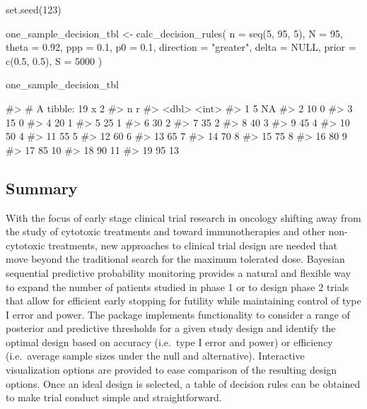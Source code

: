 \begin{Schunk}
\begin{Sinput}
set.seed(123)

one_sample_decision_tbl <- 
  calc_decision_rules(
    n = seq(5, 95, 5),
    N = 95, 
    theta = 0.92, 
    ppp = 0.1, 
    p0 = 0.1, 
    direction = "greater",
    delta = NULL, 
    prior = c(0.5, 0.5), 
    S = 5000
    )
\end{Sinput}
\end{Schunk}

\begin{Schunk}
\begin{Sinput}
one_sample_decision_tbl
\end{Sinput}
\begin{Soutput}
#> # A tibble: 19 x 2
#>        n     r
#>    <dbl> <int>
#>  1     5    NA
#>  2    10     0
#>  3    15     0
#>  4    20     1
#>  5    25     1
#>  6    30     2
#>  7    35     2
#>  8    40     3
#>  9    45     4
#> 10    50     4
#> 11    55     5
#> 12    60     6
#> 13    65     7
#> 14    70     8
#> 15    75     8
#> 16    80     9
#> 17    85    10
#> 18    90    11
#> 19    95    13
\end{Soutput}
\end{Schunk}

\hypertarget{summary}{%
\subsection{Summary}\label{summary}}

With the focus of early stage clinical trial research in oncology
shifting away from the study of cytotoxic treatments and toward
immunotherapies and other non-cytotoxic treatments, new approaches to
clinical trial design are needed that move beyond the traditional search
for the maximum tolerated dose. Bayesian sequential predictive
probability monitoring provides a natural and flexible way to expand the
number of patients studied in phase 1 or to design phase 2 trials that
allow for efficient early stopping for futility while maintaining
control of type I error and power. The  package implements
functionality to consider a range of posterior and predictive thresholds
for a given study design and identify the optimal design based on
accuracy (i.e.~type I error and power) or efficiency (i.e.~average
sample sizes under the null and alternative). Interactive visualization
options are provided to ease comparison of the resulting design options.
Once an ideal design is selected, a table of decision rules can be
obtained to make trial conduct simple and straightforward.

